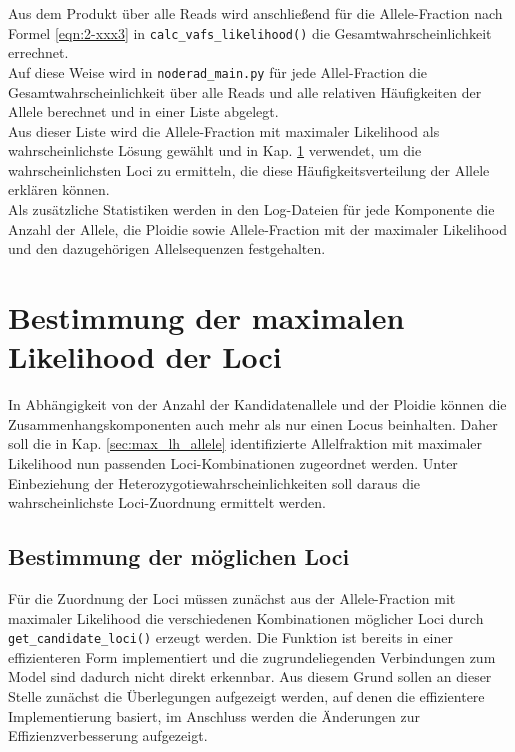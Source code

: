 Aus dem Produkt über alle Reads wird anschließend für die Allele-Fraction nach Formel \eqref{eqn:2-xxx3} in \lstinline|calc_vafs_likelihood()| die Gesamtwahrscheinlichkeit errechnet. \\

Auf diese Weise wird in \lstinline|noderad_main.py| für jede Allel-Fraction die Gesamtwahrscheinlichkeit über alle Reads und alle relativen Häufigkeiten der Allele berechnet und in einer Liste abgelegt. \\

Aus dieser Liste wird die Allele-Fraction mit maximaler Likelihood als wahrscheinlichste Lösung gewählt und in Kap. \ref{sec:max_lh_loci} verwendet, um die wahrscheinlichsten Loci zu ermitteln, die diese Häufigkeitsverteilung der Allele erklären können.  \\

Als zusätzliche Statistiken werden in den Log-Dateien für jede Komponente die Anzahl der Allele, die Ploidie sowie Allele-Fraction mit der maximaler Likelihood und den dazugehörigen Allelsequenzen festgehalten.

\section{Bestimmung der maximalen Likelihood der Loci} \label{sec:max_lh_loci}

In Abhängigkeit von der Anzahl der Kandidatenallele und der Ploidie können die Zusammenhangskomponenten auch mehr als nur einen Locus beinhalten. Daher soll die in Kap. \ref{sec:max_lh_allele} identifizierte Allelfraktion mit maximaler Likelihood nun passenden Loci-Kombinationen zugeordnet werden. Unter Einbeziehung der Heterozygotiewahrscheinlichkeiten soll daraus die wahrscheinlichste Loci-Zuordnung ermittelt werden.

\subsection{Bestimmung der möglichen Loci} \label{subsec:comb_loci}

Für die Zuordnung der Loci müssen zunächst aus der Allele-Fraction mit maximaler Likelihood die  verschiedenen Kombinationen möglicher Loci durch \lstinline|get_candidate_loci()| erzeugt werden.
Die Funktion ist bereits in einer effizienteren Form implementiert und die zugrundeliegenden Verbindungen zum Model sind dadurch nicht direkt erkennbar. Aus diesem Grund sollen an dieser Stelle zunächst die Überlegungen aufgezeigt werden, auf denen die effizientere Implementierung basiert, im Anschluss werden die Änderungen zur Effizienzverbesserung aufgezeigt. \\


